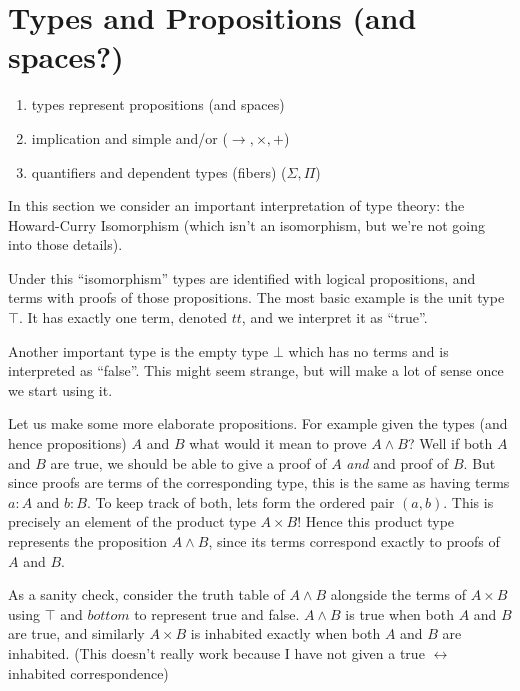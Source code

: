 \section{Types and Propositions (and spaces?)}
\begin{enumerate}
  \item types represent propositions (and spaces)
  \item implication and simple and/or ($\rightarrow, \times, +$)
  \item quantifiers and dependent types (fibers) ($\Sigma, \Pi$)
\end{enumerate}

In this section we consider an important interpretation of type theory: the
Howard-Curry Isomorphism (which isn't an isomorphism, but we're not going into
those details).

Under this ``isomorphism'' types are identified with logical propositions, and
terms with proofs of those propositions. The most basic example is the unit type
$\top$. It has exactly one term, denoted $tt$, and we interpret it as ``true''.

Another important type is the empty type $\bot$ which has no terms and is
interpreted as ``false''. This might seem strange, but will make a lot of sense
once we start using it.

Let us make some more elaborate propositions. For example given the types (and
hence propositions) $A$ and $B$ what would it mean to prove $A \land B$? Well if
both $A$ and $B$ are true, we should be able to give a proof of $A$ \emph{and}
and proof of $B$. But since proofs are terms of the corresponding type, this is
the same as having terms $a : A$ and $b : B$. To keep track of both, lets form
the ordered pair $(a, b)$. This is precisely an element of the product type $A
\times B$! Hence this product type represents the proposition $A \land B$, since
its terms correspond exactly to proofs of $A$ and $B$.

As a sanity check, consider the truth table of $A \land B$ alongside the terms of $A
\times B$ using $\top$ and $bottom$ to represent true and false. $A \land B$ is
true when both $A$ and $B$ are true, and similarly $A \times B$ is inhabited
exactly when both $A$ and $B$ are inhabited. (This doesn't really work because
I have not given a true $\leftrightarrow$ inhabited correspondence)

